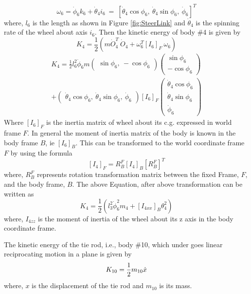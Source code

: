 { \begin{equation}
 \omega_6=\dot\phi_6k_6+\dot\theta_4i_6 ~=~ [\dot\theta_4\cos\phi_6,~ \dot\theta_4\sin\phi_6,~ \dot\phi_6]^T
 \end{equation} where, $l_6$ is the length as shown in Figure \ref{fig:SteerLink}  and $\dot\theta_4$ is the spinning rate of the wheel about axis $i_6$.
 Then the kinetic energy of body \#4 is given by
\begin{equation}
 K_4=\frac{1}{2}(m\dot O_4 ^T ~\dot O_4+ \omega_6^T [I_6]_F~\omega_6  )
 \end{equation}
 \begin{multline}
 K_4=\frac{1}{2} l_6^2 \dot\phi_6 m \begin{pmatrix}
 \sin\phi_6, ~ -\cos\phi_6
 \end{pmatrix}
 \begin{pmatrix}
 \sin\phi_6\\ -\cos\phi_6
 \end{pmatrix}\\
 + 
 \begin{pmatrix}
 \dot\theta_4 \cos\phi_6, ~ \dot\theta_4 \sin\phi_6, ~\dot\phi_6
 \end{pmatrix}[I_6]_F
 \begin{pmatrix}
 \dot\theta_4 \cos\phi_6\\ \dot\theta_4 \sin\phi_6\\ \dot\phi_6
 \end{pmatrix}
 \end{multline} Where $[I_6]_F$ is the inertia matrix of wheel about its c.g. expressed in world frame $F$.
 In general the moment of inertia matrix of the body is known in the body frame $B$, ie $[I_6]_B$. This can be transformed to the world coordinate frame $F$ by using the formula
 \[ [I_4]_F=R^F_B[I_4]_B [R^F_B]^T\] where, $R^F_B$ represents rotation transformation matrix between the fixed Frame, $F$, and the body frame, $B$. 
 The above Equation, after above transformation can be written as
 \begin{equation}
 K_4=\frac{1}{2}(l_3^2\dot\phi_6^2m_4+[I_{4xx}]_B\theta_4^2)
 \end{equation} 
where, $I_{4zz} $ is the moment of inertia of the wheel about its z axis in the body coordinate frame.

The kinetic energy of the tie rod, i.e., body \#10, which under goes linear reciprocating motion in a plane is given by
\begin{equation}
K_{10}=\frac{1}{2} m_{10} \dot{x}
\end{equation} where, $x$ is the displacement of the tie rod and $m_{10}$ is its mass.


}
